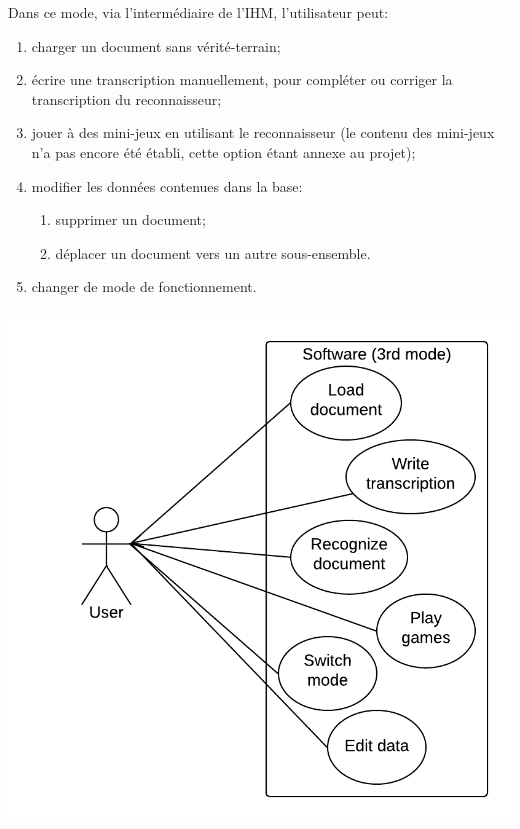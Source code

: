 Dans ce mode, via l'intermédiaire de l’IHM, l’utilisateur peut:

\begin{enumerate}
	\item charger un document sans vérité-terrain;
	\item écrire une transcription manuellement, pour compléter ou corriger la transcription du reconnaisseur;
	\item jouer à des mini-jeux en utilisant le reconnaisseur (le contenu des mini-jeux n’a pas encore été établi, cette option étant annexe au projet);
	\item modifier les données contenues dans la base:
		\begin{enumerate}
			\item supprimer un document;
			\item déplacer un document vers un autre sous-ensemble.
		\end{enumerate}
	\item changer de mode de fonctionnement.
\end{enumerate}

\paragraph{}

\begin{mdframed}[frametitle={Figure 4 : Diagramme de cas d'utilisation (mode production)}, innerbottommargin=10]
\begin{center}
\includegraphics[scale=0.6]{Usecase_3.png}
\end{center}
\end{mdframed}

